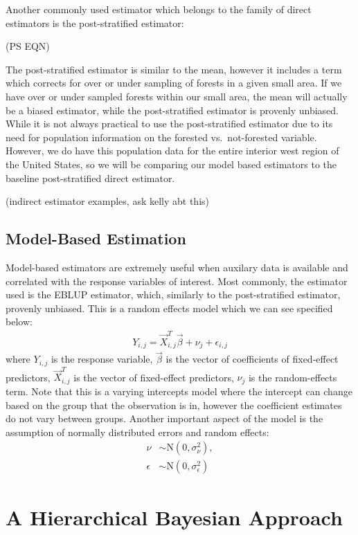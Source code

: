 \documentclass[12pt,twoside]{reedthesis}
\begin{document}
Another commonly used estimator which belongs to the family of direct estimators is the post-stratified estimator:

(PS EQN)

The post-stratified estimator is similar to the mean, however it includes a term which corrects for over or under sampling of forests in a given small area. If we have over or under sampled forests within our small area, the mean will actually be a biased estimator, while the post-stratified estimator is provenly unbiased. While it is not always practical to use the post-stratified estimator due to its need for population information on the forested vs.~not-forested variable. However, we do have this population data for the entire interior west region of the United States, so we will be comparing our model based estimators to the baseline post-stratified direct estimator.

(indirect estimator examples, ask kelly abt this)

\hypertarget{model-based-estimation}{%
\subsection{Model-Based Estimation}\label{model-based-estimation}}

Model-based estimators are extremely useful when auxilary data is available and correlated with the response variables of interest. Most commonly, the estimator used is the EBLUP estimator, which, similarly to the post-stratified estimator, provenly unbiased. This is a random effects model which we can see specified below:
\begin{align}
Y_{i,j} = \vec X_{i,j}^{T}\vec\beta + \nu_j + \epsilon_{i,j}
\end{align}
where \(Y_{i,j}\) is the response variable, \(\vec\beta\) is the vector of coefficients of fixed-effect predictors, \(\vec X_{i,j}^{T}\) is the vector of fixed-effect predictors, \(\nu_j\) is the random-effects term. Note that this is a varying intercepts model where the intercept can change based on the group that the observation is in, however the coefficient estimates do not vary between groups. Another important aspect of the model is the assumption of normally distributed errors and random effects:
\begin{align}
\nu &\sim \text{N}(0, \sigma^2_{\nu}), \\
\epsilon &\sim \text{N}(0, \sigma^2_{\epsilon})
\end{align}
\hypertarget{a-hierarchical-bayesian-approach}{%
\section{A Hierarchical Bayesian Approach}\label{a-hierarchical-bayesian-approach}}
\end{document}
